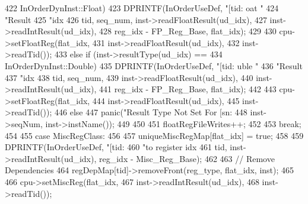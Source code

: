 \begin{DoxyCode}
{{{{{{422                                    InOrderDynInst::Float) {
423                             DPRINTF(InOrderUseDef, "[tid:%
      oat "
424                                     "Result %
425                                     "idx %
426                                     tid, seq_num, inst->readFloatResult(ud_idx),
427                                     inst->readIntResult(ud_idx), 
428                                     reg_idx - FP_Reg_Base, flat_idx);
429 
430                             cpu->setFloatReg(flat_idx,
431                                              inst->readFloatResult(ud_idx),
432                                              inst->readTid());
433                         } else if (inst->resultType(ud_idx) == 
434                                    InOrderDynInst::Double) {
435                             DPRINTF(InOrderUseDef, "[tid:%
      uble "
436                                     "Result %
437                                     "idx %
438                                     tid, seq_num,
439                                     inst->readFloatResult(ud_idx), 
440                                     inst->readIntResult(ud_idx), 
441                                     reg_idx - FP_Reg_Base, flat_idx);
442 
443                             cpu->setFloatReg(flat_idx,
444                                              inst->readFloatResult(ud_idx),
445                                              inst->readTid());
446                         } else {
447                             panic("Result Type Not Set For [sn:%
448                                   inst->seqNum, inst->instName());
449                         }
450 
451                         floatRegFileWrites++;
452                     }
453                     break;
454 
455                   case MiscRegClass:
456                     {
457                         uniqueMiscRegMap[flat_idx] = true;
458 
459                         DPRINTF(InOrderUseDef, "[tid:%
460                                 "to register idx %
461                                 tid, inst->readIntResult(ud_idx), reg_idx - 
      Misc_Reg_Base);
462 
463                         // Remove Dependencies
464                         regDepMap[tid]->removeFront(reg_type, flat_idx, inst);
465 
466                         cpu->setMiscReg(flat_idx,
467                                     inst->readIntResult(ud_idx),
468                                         inst->readTid());
}}}}}}
\end{DoxyCode}
